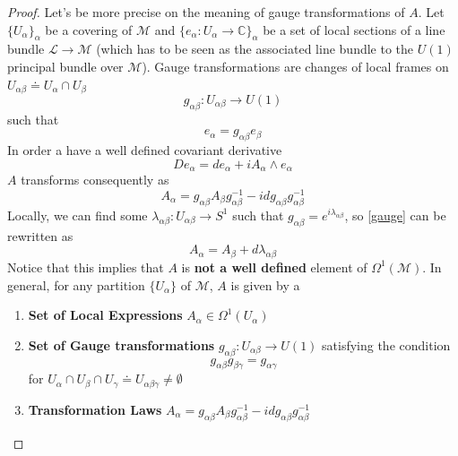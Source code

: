 \documentclass[11pt]{article}
\theoremstyle{definition}
\numberwithin{equation}{section}
\begin{document}
\begin{proof}
Let's be more precise on the meaning of gauge transformations of $A$. Let $\{U_{\alpha}\}_{\alpha}$ be a covering of $\mathcal{M}$ and $\{e_{\alpha}: U_{\alpha} \to \mathbb{C} \}_{\alpha}$ be a set of local sections of a line bundle $\mathcal{L} \to \mathcal{M}$ (which has to be seen as the associated line bundle to the $U(1)$ principal bundle over $\mathcal{M}$). Gauge transformations are changes of local frames on $U_{\alpha \beta } \doteq U_{\alpha} \cap U_{\beta}$
\begin{equation}
    g_{\alpha \beta}: U_{\alpha \beta} \to U(1) 
\end{equation}
such that
\begin{equation}
    e_{\alpha} = g_{\alpha \beta} e_{\beta}
\end{equation}
In order a have a well defined covariant derivative
\begin{equation}
    D e_{\alpha} = d  e_{\alpha} + i A_{\alpha} \wedge e_{\alpha}
\end{equation}
$A$ transforms consequently as
\begin{equation}\label{gauge}
    A_{\alpha} = g_{\alpha \beta} A_{\beta} g_{\alpha \beta}^{-1} -  i d  g_{\alpha \beta} g_{\alpha \beta}^{-1}
\end{equation}
Locally, we can find some $\lambda_{\alpha \beta}:U_{\alpha \beta} \to S^1$ such that $g_{\alpha \beta} = e^{i \lambda_{\alpha \beta}}$, so \eqref{gauge} can be rewritten as
\begin{equation}
    A_{\alpha} = A_{\beta}  + d \lambda_{\alpha \beta}
\end{equation}
Notice that this implies that $A$ is \textbf{not a well defined} element of $\Omega^1(\mathcal{M})$. In general, for any partition $\{U_{\alpha}\}$ of $\mathcal{M}$, $A$ is given by a
\begin{enumerate}
    \item \textbf{Set of Local Expressions} $A_{\alpha} \in \Omega^1(U_{\alpha})$
    \item \textbf{Set of Gauge transformations} $g_{\alpha \beta} :U_{\alpha \beta} \to U(1)$ satisfying the condition
    \begin{equation}\label{co}
        g_{\alpha \beta} g_{\beta \gamma} = g_{\alpha \gamma} 
    \end{equation}
    for $U_{\alpha} \cap U_{\beta} \cap U_{\gamma} \doteq U_{\alpha \beta \gamma} \neq \emptyset$
    \item \textbf{Transformation Laws} $ A_{\alpha} = g_{\alpha \beta} A_{\beta} g_{\alpha \beta}^{-1} -  i d  g_{\alpha \beta} g_{\alpha \beta}^{-1}$  
\end{enumerate}


\end{proof}
\end{document}
